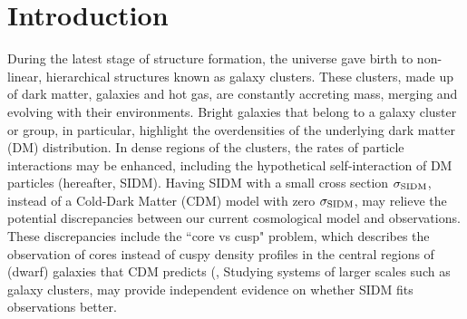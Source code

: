 \section{Introduction} 
During the latest stage of structure formation, the universe gave birth to
non-linear, hierarchical structures known as galaxy clusters. 
These clusters, made up of dark matter, galaxies and hot gas,
are constantly accreting mass, merging and evolving with their
environments. Bright galaxies that belong to a galaxy cluster or group, in 
particular, highlight the overdensities of the underlying dark matter (DM) 
distribution. In dense regions of the clusters, the rates of particle
interactions may be enhanced, including the hypothetical self-interaction of DM
particles (hereafter, SIDM). Having SIDM with a small cross section
$\sigma_{\rm SIDM}$, instead of a Cold-Dark Matter (CDM) model with zero $\sigma_{\rm
SIDM}$, 
may relieve the potential discrepancies 
between our current cosmological model and observations. These discrepancies include the 
``core vs cusp" problem, which describes the observation of cores instead of
cuspy density profiles in the central regions of
(dwarf) galaxies that CDM predicts (\citealt{Rocha2013a},
Studying systems of larger scales such as galaxy clusters, may provide independent 
evidence on whether SIDM fits observations better. 

